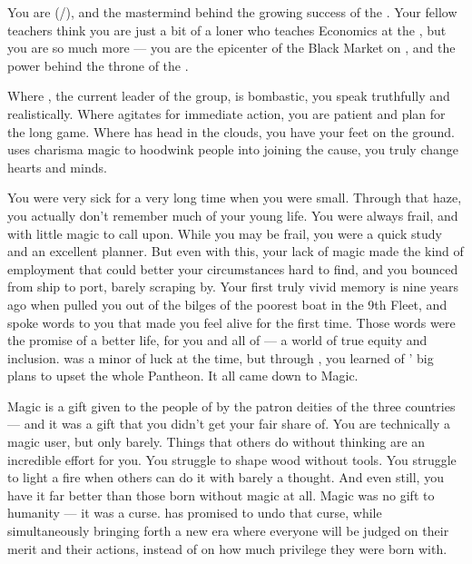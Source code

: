 \documentclass[char]{GL2020}
\begin{document}
\name{\cChupSecond{}}

You are \cChupSecond{\full} (\cChupSecond{\they}/\cChupSecond{\them}), and the mastermind behind the growing success of the \pGoaties{}. Your fellow teachers think you are just a bit of a loner who teaches Economics at the \pSchool{}, but you are so much more — you are the epicenter of the Black Market on \pEarth{}, and the power behind the throne of the \pGoaties{}.

Where \cChupLeader{\full}, the current leader of the group, is bombastic, you speak truthfully and realistically. Where \cChupLeader{} agitates for immediate action, you are patient and plan for the long game. Where \cChupLeader{} has \cChupLeader{\their} head in the clouds, you have your feet on the ground. \cChupLeader{} uses charisma magic to hoodwink people into joining the cause, you truly change hearts and minds.

You were very sick for a very long time when you were small. Through that haze, you actually don't remember much of your young life. You were always frail, and with little magic to call upon. While you may be frail, you were a quick study and an excellent planner. But even with this, your lack of magic made the kind of employment that could better your circumstances hard to find, and you bounced from ship to port, barely scraping by. Your first truly vivid memory is nine years ago when \cChupLeader{} pulled you out of the bilges of the poorest boat in the 9th Fleet, and spoke words to you that made you feel alive for the first time. Those words were the promise of a better life, for you and all of \pEarth{} — a world of true equity and inclusion. \cGenesis{} was a minor \cGenesis{\Deity} of luck at the time, but through \cChupLeader{}, you learned of \cGenesis{}' big plans to upset the whole Pantheon. It all came down to Magic.

Magic is a gift given to the people of \pEarth{} by the patron deities of the three countries — and it was a gift that you didn't get your fair share of. You are technically a magic user, but only barely. Things that others do without thinking are an incredible effort for you. You struggle to shape wood without tools. You struggle to light a fire when others can do it with barely a thought. And even still, you have it far better than those born without magic at all. Magic was no gift to humanity — it was a curse. \cGenesis{} has promised to undo that curse, while simultaneously bringing forth a new era where everyone will be judged on their merit and their actions, instead of on how much privilege they were born with.
\end{document}
